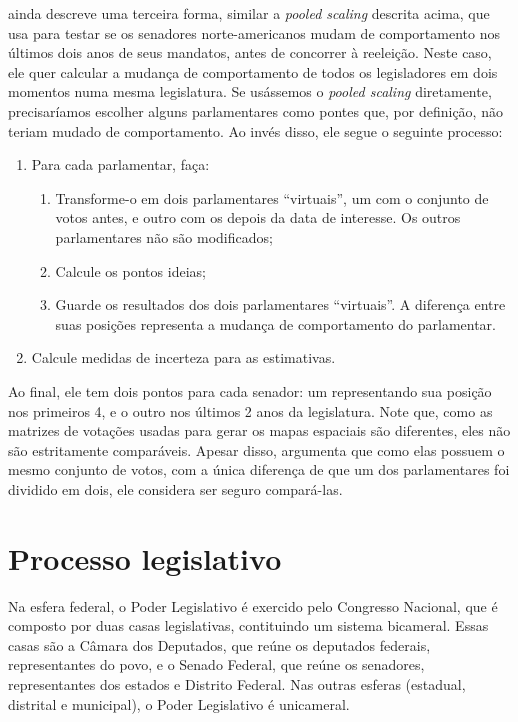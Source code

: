 \documentclass[a4paper,titlepage]{ppgi}\usepackage[]{graphicx}\usepackage[]{color}
\begin{document}
 ainda descreve uma terceira forma, similar a
\emph{pooled scaling} descrita acima, que usa para testar se os senadores
norte-americanos mudam de comportamento nos últimos dois anos de seus mandatos,
antes de concorrer à reeleição. Neste caso, ele quer calcular a mudança de
comportamento de todos os legisladores em dois momentos numa mesma legislatura.
Se usássemos o \emph{pooled scaling} diretamente, precisaríamos escolher alguns
parlamentares como pontes que, por definição, não teriam mudado de
comportamento. Ao invés disso, ele segue o seguinte processo:

\begin{enumerate}
  \item Para cada parlamentar, faça:
    \begin{enumerate}
      \item Transforme-o em dois parlamentares ``virtuais'', um com o conjunto
de votos antes, e outro com os depois da data de interesse. Os outros
parlamentares não são modificados;
      \item Calcule os pontos ideias;
      \item Guarde os resultados dos dois parlamentares ``virtuais''. A
diferença entre suas posições representa a mudança de comportamento do
parlamentar.
    \end{enumerate}
  \item Calcule medidas de incerteza para as estimativas.
\end{enumerate}

Ao final, ele tem dois pontos para cada senador: um representando sua posição
nos primeiros 4, e o outro nos últimos 2 anos da legislatura. Note que, como as
matrizes de votações usadas para gerar os mapas espaciais são diferentes, eles
não são estritamente comparáveis. Apesar disso, 
argumenta que como elas possuem o mesmo conjunto de votos, com a única
diferença de que um dos parlamentares foi dividido em dois, ele considera ser
seguro compará-las.

\section{Processo legislativo}

Na esfera federal, o Poder Legislativo é exercido pelo Congresso Nacional, que
é composto por duas casas legislativas, contituindo um sistema bicameral. Essas
casas são a Câmara dos Deputados, que reúne os deputados federais,
representantes do povo, e o Senado Federal, que reúne os senadores,
representantes dos estados e Distrito Federal. Nas outras esferas (estadual,
distrital e municipal), o Poder Legislativo é unicameral.
\end{document}
